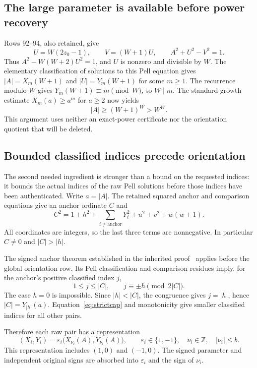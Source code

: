 \documentclass[11pt]{article}
\theoremstyle{definition}\newtheorem{definition}[theorem]{Definition}
\newcommand{\Z}{\mathbb Z}\newcommand{\N}{\mathbb N}
\newcommand{\pair}[2]{\bigl(X_{#1}(#2),Y_{#1}(#2)\bigr)}
\begin{document}
\subsection{The large parameter is available before power recovery}

Rows 92--94, also retained, give
\[
 U=W(2z_0-1),\qquad V=(W+1)U,\qquad A^2+U^2-V^2=1.
\]
Thus $A^2-W(W+2)U^2=1$, and $U$ is nonzero and divisible by $W$.
The elementary classification of solutions to this Pell equation gives
$|A|=X_m(W+1)$ and $|U|=Y_m(W+1)$ for some $m\ge1$.
The recurrence modulo $W$ gives $Y_m(W+1)\equiv m\pmod W$, so $W\mid m$.
The standard growth estimate $X_m(a)\ge a^m$ for $a\ge2$ now yields
\begin{equation}\label{eq:largeA}
 |A|\ge(W+1)^W>W^W.
\end{equation}
This argument uses neither an exact-power certificate nor the orientation
quotient that will be deleted.

\subsection{Bounded classified indices precede orientation}
\label{sec:rawindex}

The second needed ingredient is stronger than a bound on the requested
indices: it bounds the actual indices of the raw Pell solutions before
those indices have been authenticated. Write $a=|A|$. The retained squared
anchor and comparison equations give an anchor ordinate $C$ and
\begin{equation}\label{eq:strictcap}
 C^2=1+h^2+\sum_{i\ne\mathrm{anchor}}Y_i^2
          +u^2+v^2+w(w+1).
\end{equation}
All coordinates are integers, so the last three terms are nonnegative.
In particular $C\ne0$ and $|C|>|h|$.

The signed anchor theorem established in the inherited proof~\cite{anchor135}
applies before the global orientation row. Its Pell classification and
comparison residues imply, for the anchor's positive classified index $j$,
\[
 1\le j\le |C|,\qquad j\equiv\pm h\pmod{2|C|}.
\]
The case $h=0$ is impossible. Since $|h|<|C|$, the congruence gives
$j=|h|$, hence $|C|=Y_{|h|}(a)$. Equation~\eqref{eq:strictcap} and
monotonicity give smaller classified indices for all other pairs.

Therefore each raw pair has a representation
\begin{equation}\label{eq:rawclass}
 (X_i,Y_i)=\varepsilon_i\pair{\nu_i}{A},\qquad
 \varepsilon_i\in\{1,-1\},\quad \nu_i\in\Z,\quad |\nu_i|\le b.
\end{equation}
This representation includes $(1,0)$ and $(-1,0)$. The signed parameter
and independent original signs are absorbed into $\varepsilon_i$ and
the sign of $\nu_i$.
\end{document}
